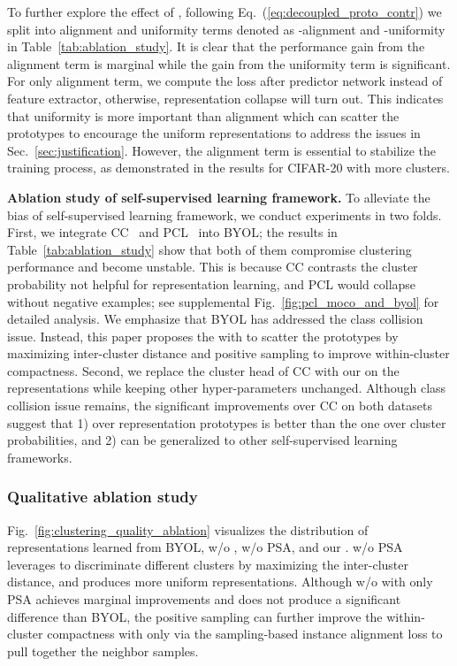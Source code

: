 To further explore the effect of \lossname, following Eq.~(\ref{eq:decoupled_proto_contr}) we split \lossname into alignment and uniformity terms denoted as \lossname-alignment and \lossname-uniformity in Table~\ref{tab:ablation_study}. It is clear that the performance gain from the alignment term is marginal while the gain from the uniformity term is significant. For only alignment term, we compute the loss after predictor network instead of feature extractor, otherwise, representation collapse will turn out. This indicates that uniformity is more important than alignment which can scatter the prototypes to encourage the uniform representations to address the issues in Sec.~\ref{sec:justification}. However, the alignment term is essential to stabilize the training process, as demonstrated in the results for CIFAR-20 with more clusters.

\noindent\textbf{Ablation study of self-supervised learning framework.}\quad
To alleviate the bias of self-supervised learning framework, we conduct experiments in two folds. First, we integrate CC~\cite{li2021contrastive} and PCL~\cite{li2020prototypical} into BYOL; the results in Table~\ref{tab:ablation_study} show that both of them compromise clustering performance and become unstable. This is because CC contrasts the cluster probability not helpful for representation learning, and PCL would collapse without negative examples; see supplemental Fig.~\ref{fig:pcl_moco_and_byol} for detailed analysis.
We emphasize that BYOL has addressed the class collision issue. Instead, this paper proposes the \methodname with \lossname to scatter the prototypes by maximizing inter-cluster distance and positive sampling to improve within-cluster compactness.
Second, we replace the cluster head of CC with our \lossname on the representations while keeping other hyper-parameters unchanged. Although class collision issue remains, the significant improvements over CC on both datasets suggest that 1) \lossname over representation prototypes is better than the one over cluster probabilities, and 2) \lossname can be generalized to other self-supervised learning frameworks.

\subsubsection{Qualitative ablation study} 
Fig.~\ref{fig:clustering_quality_ablation} visualizes the distribution of representations learned from BYOL, \methodname w/o \lossname, \methodname w/o PSA, and our \methodname.
\methodname w/o PSA leverages \lossname to discriminate different clusters by maximizing the inter-cluster distance, and produces more uniform representations.
Although \methodname w/o \lossname with only PSA achieves marginal improvements and does not produce a significant difference than BYOL, the positive sampling can further improve the within-cluster compactness with only \lossname via the sampling-based instance alignment loss to pull together the neighbor samples.

